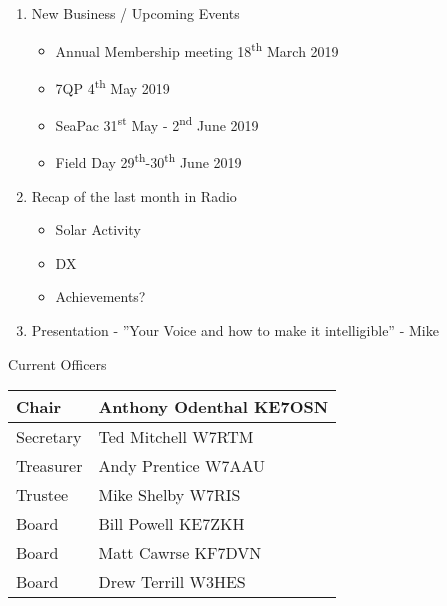 \documentclass[letter,11pt]{extarticle}
\begin{document}
\begin{enumerate}
		\item  New Business / Upcoming Events
			\begin{itemize}
				\item Annual Membership meeting 18\textsuperscript{th} March 2019
				\item 7QP 4\textsuperscript{th} May 2019
				\item SeaPac 31\textsuperscript{st} May - 2\textsuperscript{nd} June 2019
				\item Field Day 29\textsuperscript{th}-30\textsuperscript{th} June 2019
			\end{itemize}
		\item Recap of the last month in Radio
			\begin{itemize}
				\item Solar Activity
				\item DX
				\item Achievements?
			\end{itemize}
		\item  Presentation - ''Your Voice and how to make it intelligible'' - Mike

	\end{enumerate}


	Current Officers \\
	\begin{tabular}{|l|l|} \hline
		Chair & Anthony Odenthal KE7OSN \\ \hline
		Secretary & Ted Mitchell W7RTM \\ \hline
		Treasurer & Andy Prentice W7AAU \\ \hline
		Trustee & Mike Shelby W7RIS   \\ \hline
		Board & Bill Powell KE7ZKH \\ \hline
		Board & Matt Cawrse KF7DVN \\ \hline
		Board & Drew Terrill W3HES\\ \hline
	\end{tabular}
	
	\subsection*{}
	
\end{document}
